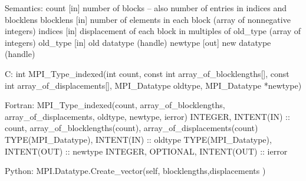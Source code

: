 Semantics:
count [in] number of blocks --
    also number of entries in indices and blocklens
blocklens [in] number of elements in each block
    (array of nonnegative integers)
indices [in] displacement of each block in multiples of old_type
    (array of integers)
old_type [in] old datatype (handle)
newtype [out] new datatype (handle)

C:
int MPI_Type_indexed(int count,
    const int array_of_blocklengths[],
    const int array_of_displacements[], 
    MPI_Datatype oldtype, MPI_Datatype
    *newtype)

Fortran:
MPI_Type_indexed(count, array_of_blocklengths, array_of_displacements,
    oldtype, newtype, ierror)
INTEGER, INTENT(IN) :: count, array_of_blocklengths(count),
array_of_displacements(count)
TYPE(MPI_Datatype), INTENT(IN) :: oldtype
TYPE(MPI_Datatype), INTENT(OUT) :: newtype
INTEGER, OPTIONAL, INTENT(OUT) :: ierror

Python:
MPI.Datatype.Create_vector(self, blocklengths,displacements )
